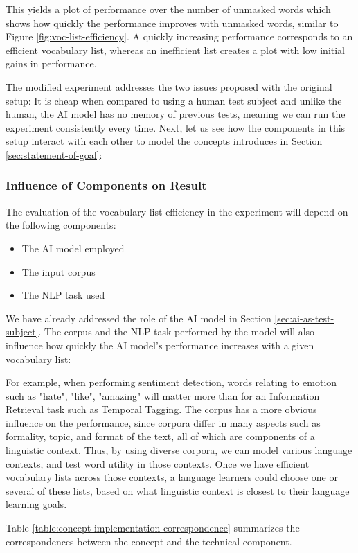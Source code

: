 This yields a plot of performance over the number of unmasked words which shows how quickly the performance improves with unmasked words, similar to Figure \ref{fig:voc-list-efficiency}.
A quickly increasing performance corresponds to an efficient vocabulary list, whereas an inefficient list creates a plot with low initial gains in performance.

The modified experiment addresses the two issues proposed with the original setup:
It is cheap when compared to using a human test subject and unlike the human, the AI model has no memory of previous tests, meaning we can run the experiment consistently every time.
Next, let us see how the components in this setup interact with each other to model the concepts introduces in Section \ref{sec:statement-of-goal}:

\subsubsection{Influence of Components on Result}
The evaluation of the vocabulary list efficiency in the experiment will depend on the following components:

\begin{itemize}
	\item The AI model employed
	\item The input corpus
	\item The NLP task used
\end{itemize}

We have already addressed the role of the AI model in Section \ref{sec:ai-as-test-subject}.
The corpus and the NLP task performed by the model will also influence how quickly the AI model's performance increases with a given vocabulary list:

For example, when performing sentiment detection, words relating to emotion such as "hate", "like", "amazing" will matter more than for an Information Retrieval task such as Temporal Tagging.
The corpus has a more obvious influence on the performance, since corpora differ in many aspects such as formality, topic, and format of the text, all of which are components of a linguistic context.
Thus, by using diverse corpora, we can model various language contexts, and test word utility in those contexts.
Once we have efficient vocabulary lists across those contexts, a language learners could choose one or several of these lists, based on what linguistic context is closest to their language learning goals.

Table \ref{table:concept-implementation-correspondence} summarizes the correspondences between the concept and the technical component.

